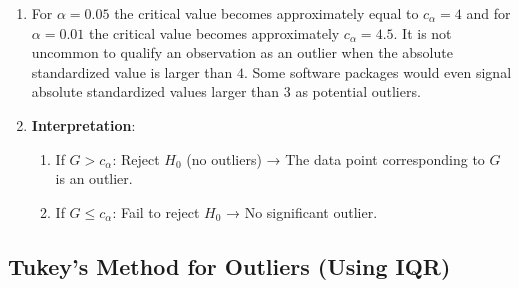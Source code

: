 \begin{enumerate}
    \item  For $\alpha = 0.05$ the critical value becomes approximately equal to $c_\alpha = 4$ and for $\alpha = 0.01$ the critical value becomes approximately $c_\alpha = 4.5$. 
    It is not uncommon to qualify an observation as an outlier when the absolute standardized value is larger than $4$. 
    Some software packages would even signal absolute standardized values larger than $3$ as potential outliers.
    \hfill \cite{statistics/book/Statistics-for-Data-Scientists/Maurits-Kaptein}

    \item \textbf{Interpretation}:
    \hfill \cite{common/online/chatgpt}
    \begin{enumerate}
        \item If $G>c_\alpha$: Reject $H_0$ (no outliers) → The data point corresponding to $G$ is an outlier.
        \hfill \cite{common/online/chatgpt}

        \item If $G\leq c_\alpha$: Fail to reject $H_0$ → No significant outlier.
        \hfill \cite{common/online/chatgpt}
    \end{enumerate}

\end{enumerate}






\subsection{Tukey’s Method for Outliers (Using IQR)}

